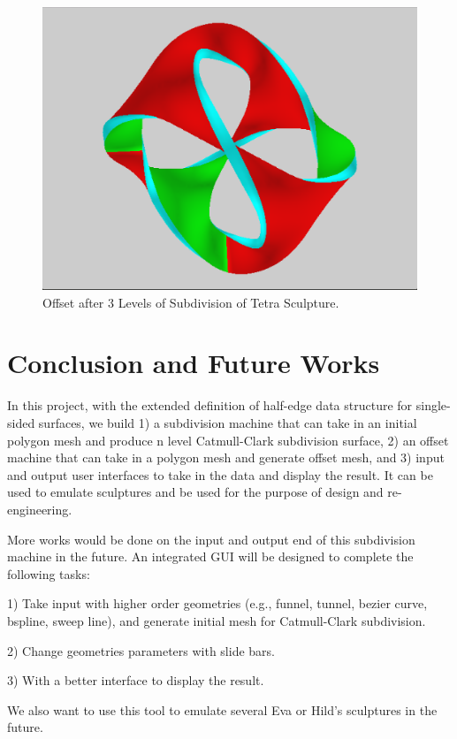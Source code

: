 \documentclass[12pt]{article}
\begin{document}
\begin{figure}[h!]
  \centering
    \includegraphics[width=\textwidth]{TetraOff}
  \caption{Offset after 3 Levels of Subdivision of Tetra Sculpture.} \label{figure:TetraOff}
\end{figure}

\newpage
\section{Conclusion and Future Works}
In this project, with the extended definition of half-edge data structure for single-sided surfaces, we build 1) a subdivision machine that can take in an initial polygon mesh and produce n level Catmull-Clark subdivision surface, 2) an offset machine that can take in a polygon mesh and generate offset mesh, and 3) input and output user interfaces to take in the data and display the result. It can be used to emulate sculptures and be used for the purpose of design and re-engineering.

More works would be done on the input and output end of this subdivision machine in the future. An integrated GUI will be designed to complete the following tasks: 

1) Take input with higher order geometries (e.g., funnel, tunnel, bezier curve, bspline, sweep line), and generate initial mesh for Catmull-Clark subdivision.

2) Change geometries parameters with slide bars.

3) With a better interface to display the result.

We also want to use this tool to emulate several Eva or Hild's sculptures in the future.
\end{document}

